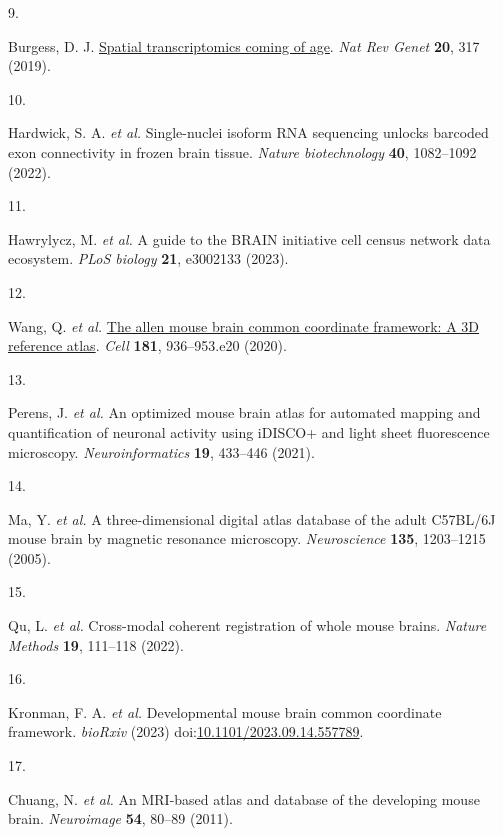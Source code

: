\documentclass[
  12pt,
]{article}
\newlength{\cslhangindent}
\newlength{\csllabelwidth}
\newenvironment{CSLReferences}[2] %
 {\begin{list}{}{%
  \setlength{\itemindent}{0pt}
  \setlength{\leftmargin}{0pt}
  \setlength{\parsep}{0pt}
  \ifodd #1
   \setlength{\leftmargin}{\cslhangindent}
   \setlength{\itemindent}{-1\cslhangindent}
  \fi
  \setlength{\itemsep}{#2\baselineskip}}}
 {\end{list}}
\newcommand{\CSLLeftMargin}[1]{\parbox[t]{\csllabelwidth}{\strut#1\strut}}
\newcommand{\CSLRightInline}[1]{\parbox[t]{\linewidth - \csllabelwidth}{\strut#1\strut}}
\begin{document}
\begin{CSLReferences}{0}{0}
\CSLLeftMargin{9. }%
\CSLRightInline{Burgess, D. J.
\href{https://doi.org/10.1038/s41576-019-0129-z}{Spatial transcriptomics
coming of age}. \emph{Nat Rev Genet} \textbf{20}, 317 (2019).}

\CSLLeftMargin{10. }%
\CSLRightInline{Hardwick, S. A. \emph{et al.} Single-nuclei isoform RNA
sequencing unlocks barcoded exon connectivity in frozen brain tissue.
\emph{Nature biotechnology} \textbf{40}, 1082--1092 (2022).}

\CSLLeftMargin{11. }%
\CSLRightInline{Hawrylycz, M. \emph{et al.} A guide to the BRAIN
initiative cell census network data ecosystem. \emph{PLoS biology}
\textbf{21}, e3002133 (2023).}

\CSLLeftMargin{12. }%
\CSLRightInline{Wang, Q. \emph{et al.}
\href{https://doi.org/10.1016/j.cell.2020.04.007}{The allen mouse brain
common coordinate framework: A 3D reference atlas}. \emph{Cell}
\textbf{181}, 936--953.e20 (2020).}

\CSLLeftMargin{13. }%
\CSLRightInline{Perens, J. \emph{et al.} An optimized mouse brain atlas
for automated mapping and quantification of neuronal activity using
iDISCO+ and light sheet fluorescence microscopy. \emph{Neuroinformatics}
\textbf{19}, 433--446 (2021).}

\CSLLeftMargin{14. }%
\CSLRightInline{Ma, Y. \emph{et al.} A three-dimensional digital atlas
database of the adult C57BL/6J mouse brain by magnetic resonance
microscopy. \emph{Neuroscience} \textbf{135}, 1203--1215 (2005).}

\CSLLeftMargin{15. }%
\CSLRightInline{Qu, L. \emph{et al.} Cross-modal coherent registration
of whole mouse brains. \emph{Nature Methods} \textbf{19}, 111--118
(2022).}

\CSLLeftMargin{16. }%
\CSLRightInline{Kronman, F. A. \emph{et al.} Developmental mouse brain
common coordinate framework. \emph{bioRxiv} (2023)
doi:\href{https://doi.org/10.1101/2023.09.14.557789}{10.1101/2023.09.14.557789}.}

\CSLLeftMargin{17. }%
\CSLRightInline{Chuang, N. \emph{et al.} An MRI-based atlas and database
of the developing mouse brain. \emph{Neuroimage} \textbf{54}, 80--89
(2011).}


\end{CSLReferences}
\end{document}
